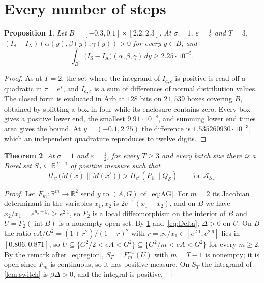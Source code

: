 \documentclass[11pt]{amsart}
\newtheorem{theorem}{Theorem}[section]
\newtheorem{proposition}[theorem]{Proposition}
\theoremstyle{definition}
\theoremstyle{remark}
\newcommand{\R}{\mathbb R}
\newcommand{\ANTI}{\mathrm{A}}
\newcommand{\SAME}{\mathrm{S}}
\newcommand{\He}{H_{e^{\varepsilon}}}
\begin{document}
\section{Every number of steps}\label{sec:allT}

\begin{proposition}\label{prop:T3}
Let $B=[-0.3,0.1]\times[2.2,2.3]$. At $\sigma=1$, $\varepsilon=\frac12$ and $T=3$, $(I_{\SAME}-I_{\ANTI})(\alpha(y),\beta(y),\gamma(y))>0$ for every $y\in B$, and
\[
\int_B\bigl(I_{\SAME}-I_{\ANTI}\bigr)(\alpha,\beta,\gamma)\,dy\ge2.25\cdot10^{-5}.
\]
\end{proposition}

\begin{proof}
As at $T=2$, the set where the integrand of $I_{a,c}$ is positive is read off a quadratic in $\tau=e^{s}$, and $I_{a,c}$ is a sum of differences of normal distribution values. The closed form is evaluated in Arb at $128$ bits on $21{,}539$ boxes covering $B$, obtained by splitting a box in four while its enclosure contains zero. Every box gives a positive lower end, the smallest $9.91\cdot10^{-8}$, and summing lower end times area gives the bound. At $y=(-0.1,2.25)$ the difference is $1.535260930\cdot10^{-3}$, which an independent quadrature reproduces to twelve digits.
\end{proof}

\begin{theorem}\label{thm:allT}
At $\sigma=1$ and $\varepsilon=\frac12$, for every $T\ge3$ and every batch size there is a Borel set $S_T\subseteq\R^{T-1}$ of positive measure such that
\[
\He\bigl(M(x)\|M(x')\bigr)>\He(P_{\mathcal S}\|Q_{\mathcal S})\qquad\text{for }\mathcal A_{S_T}.
\]
\end{theorem}

\begin{proof}
Let $F_m\colon\R^m\to\R^2$ send $y$ to $(A,G)$ of~\eqref{eq:AG}. For $m=2$ its Jacobian determinant in the variables $x_1,x_2$ is $2e^{-1}(x_1-x_2)$, and on $B$ we have $x_2/x_1=e^{y_2-y_1}\ge e^{2.1}$, so $F_2$ is a local diffeomorphism on the interior of $B$ and $U=F_2(\operatorname{int}B)$ is a nonempty open set. By \cref{prop:T3} and~\eqref{eq:Delta}, $\Delta>0$ on $U$. On $B$ the ratio $eA/G^2=(1+r^2)/(1+r)^2$ with $r=x_2/x_1\in[e^{2.1},e^{2.6}]$ lies in $[0.806,0.871]$, so $U\subseteq\{G^2/2<eA<G^2\}\subseteq\{G^2/m<eA<G^2\}$ for every $m\ge2$. By the remark after~\eqref{eq:region}, $S_T=F_m^{-1}(U)$ with $m=T-1$ is nonempty; it is open since $F_m$ is continuous, so it has positive measure. On $S_T$ the integrand of \cref{lem:switch} is $\beta\Delta>0$, and the integral is positive.
\end{proof}
\end{document}
